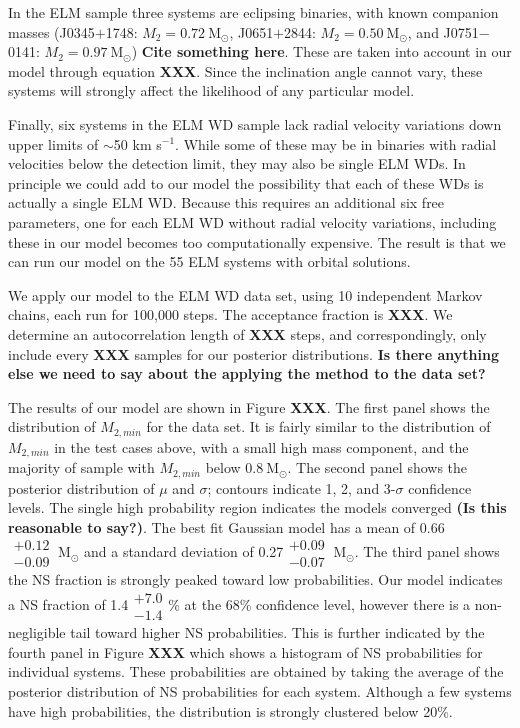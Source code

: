 \documentclass[letterpaper,12pt,preprint]{aastex}
\newcommand{\Msun}{\mathrm{M}_\odot}
\begin{document}
In the ELM sample three systems are eclipsing binaries, with known companion masses (J0345$+$1748: $M_2=0.72~\Msun$, J0651$+$2844: $M_2=0.50~\Msun$, and J0751$-$0141: $M_2=0.97~\Msun$) {\bf Cite something here}. These are taken into account in our model through equation {\bf XXX}. Since the inclination angle cannot vary, these systems will strongly affect the likelihood of any particular model. 

Finally, six systems in the ELM WD sample lack radial velocity variations down upper limits of $\sim$50 km s$^{-1}$. While some of these may be in binaries with radial velocities below the detection limit, they may also be single ELM WDs. In principle we could add to our model the possibility that each of these WDs is actually a single ELM WD. Because this requires an additional six free parameters, one for each ELM WD without radial velocity variations, including these in our model becomes too computationally expensive. The result is that we can run our model on the 55 ELM systems with orbital solutions.


We apply our model to the ELM WD data set, using 10 independent Markov chains, each run for 100,000 steps. The acceptance fraction is {\bf XXX}. We determine an autocorrelation length of {\bf XXX} steps, and correspondingly, only include every {\bf XXX} samples for our posterior distributions. {\bf Is there anything else we need to say about the applying the method to the data set?}


The results of our model are shown in Figure {\bf XXX}. The first panel shows the distribution of $M_{2,min}$ for the data set. It is fairly similar to the distribution of $M_{2,min}$ in the test cases above, with a small high mass component, and the majority of sample with $M_{2,min}$ below $0.8~\Msun$. The second panel shows the posterior distribution of $\mu$ and $\sigma$; contours indicate 1, 2, and 3-$\sigma$ confidence levels. The single high probability region indicates the models converged {\bf (Is this reasonable to say?)}. The best fit Gaussian model has a mean of 0.66 $\substack{+0.12 \\ -0.09}~\Msun$ and a standard deviation of 0.27$\substack{+0.09 \\ -0.07}~\Msun$. The third panel shows the NS fraction is strongly peaked toward low probabilities. Our model indicates a NS fraction of 1.4$\substack{+7.0 \\ -1.4}$\% at the 68\% confidence level, however there is a non-negligible tail toward higher NS probabilities. This is further indicated by the fourth panel in Figure {\bf XXX} which shows a histogram of NS probabilities for individual systems. These probabilities are obtained by taking the average of the posterior distribution of NS probabilities for each system. Although a few systems have high probabilities, the distribution is strongly clustered below 20\%.
\end{document}
